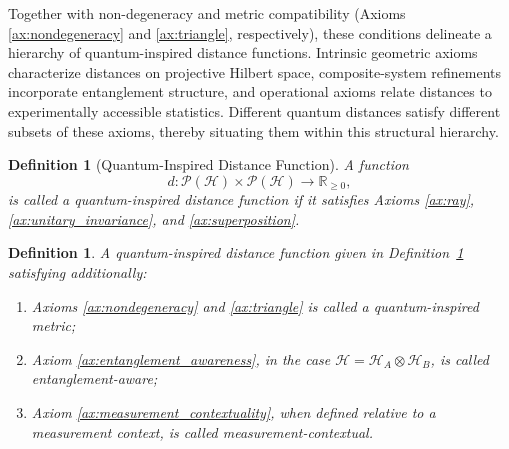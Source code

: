 \documentclass[aps,pra,reprint,nofootinbib,showpacs,superscriptaddress]{revtex4-1}
\newtheorem{definition}[theorem]{Definition}
\newcommand{\Hilbert}{\mathcal{H}}
\newcommand{\Proj}{\mathcal{P}}
\begin{document}
Together with non-degeneracy and metric compatibility (Axioms \ref{ax:nondegeneracy} and \ref{ax:triangle}, respectively), these conditions delineate a hierarchy of quantum-inspired distance functions. 
Intrinsic geometric axioms characterize distances on projective Hilbert space, composite-system refinements incorporate entanglement structure, and operational axioms relate distances to experimentally accessible statistics. 
Different quantum distances satisfy different subsets of these axioms, thereby situating them within this structural hierarchy.
\begin{definition}[Quantum-Inspired Distance Function]\label{def:qidf}
A function
\[
d : \Proj(\Hilbert) \times \Proj(\Hilbert)
\to \mathbb{R}_{\ge 0},
\]
is called a \emph{quantum-inspired distance function}
if it satisfies Axioms \ref{ax:ray}, 
\ref{ax:unitary_invariance}, and \ref{ax:superposition}.
\end{definition}

\begin{definition}
A quantum-inspired distance function given in Definition~\ref{def:qidf} satisfying additionally:
\begin{enumerate}[label=(\roman*)]
    \item Axioms \ref{ax:nondegeneracy} and \ref{ax:triangle}
    is called a \emph{quantum-inspired metric};
    
    \item Axiom \ref{ax:entanglement_awareness}, in the case
    $\Hilbert = \Hilbert_A \otimes \Hilbert_B$,
    is called \emph{entanglement-aware};
    
    \item Axiom \ref{ax:measurement_contextuality}, when defined relative to a measurement context,
    is called \emph{measurement-contextual}.
\end{enumerate}
\end{definition}





\end{document}
